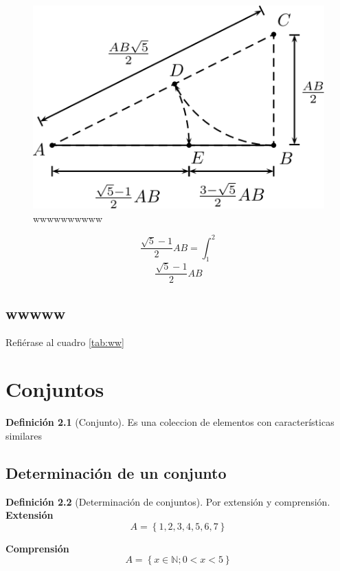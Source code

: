 \documentclass[
  16pt,
]{krantz}
\theoremstyle{definition}
\newtheorem{definition}{Definición}[chapter]
\theoremstyle{definition}
\theoremstyle{definition}
\theoremstyle{definition}
\theoremstyle{remark}
\begin{document}
\begin{figure}

{\centering \includegraphics{aureo} 

}

\caption{wwwwwwwwww}\label{fig:ww1}
\end{figure}

\[\frac{\sqrt{5}-1}{2}AB=\int_1^2\]
\[\frac{\sqrt{5}-1}{2}AB\]

\hypertarget{wwwww}{%
\section{wwwww}\label{wwwww}}

Refiérase al cuadro \ref{tab:ww}

\hypertarget{conjuntos}{%
\chapter{Conjuntos}\label{conjuntos}}

\begin{definition}[Conjunto]
\protect\hypertarget{def:conjunto}{}\label{def:conjunto}Es una coleccion de elementos con características similares
\end{definition}

\hypertarget{determinaciuxf3n-de-un-conjunto}{%
\section{Determinación de un conjunto}\label{determinaciuxf3n-de-un-conjunto}}

\begin{definition}[Determinación de conjuntos]
\protect\hypertarget{def:conjunto2}{}\label{def:conjunto2}Por extensión y comprensión.
\textbf{Extensión}
\[A=\left\{ 1,2,3,4,5,6,7 \right\} \]

\textbf{Comprensión}
\[A=\left\{ x \in \mathbb{N};0<x<5 \right\}  \]
\end{definition}
\end{document}
